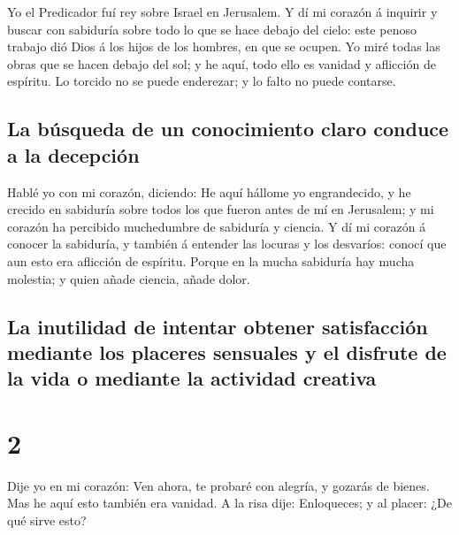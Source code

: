  Yo el Predicador fuí rey sobre Israel en Jerusalem.
 Y dí mi corazón á inquirir y buscar con sabiduría sobre
todo lo que se hace debajo del cielo: este penoso trabajo dió Dios á los
hijos de los hombres, en que se ocupen.  Yo miré todas
las obras que se hacen debajo del sol; y he aquí, todo ello es vanidad y
aflicción de espíritu.  Lo torcido no se puede enderezar;
y lo falto no puede contarse.

\hypertarget{la-buxfasqueda-de-un-conocimiento-claro-conduce-a-la-decepciuxf3n}{%
\subsection{La búsqueda de un conocimiento claro conduce a la
decepción}\label{la-buxfasqueda-de-un-conocimiento-claro-conduce-a-la-decepciuxf3n}}

 Hablé yo con mi corazón, diciendo: He aquí hállome yo
engrandecido, y he crecido en sabiduría sobre todos los que fueron antes
de mí en Jerusalem; y mi corazón ha percibido muchedumbre de sabiduría y
ciencia.  Y dí mi corazón á conocer la sabiduría, y
también á entender las locuras y los desvaríos: conocí que aun esto era
aflicción de espíritu.  Porque en la mucha sabiduría hay
mucha molestia; y quien añade ciencia, añade dolor.

\hypertarget{la-inutilidad-de-intentar-obtener-satisfacciuxf3n-mediante-los-placeres-sensuales-y-el-disfrute-de-la-vida-o-mediante-la-actividad-creativa}{%
\subsection{La inutilidad de intentar obtener satisfacción mediante los
placeres sensuales y el disfrute de la vida o mediante la actividad
creativa}\label{la-inutilidad-de-intentar-obtener-satisfacciuxf3n-mediante-los-placeres-sensuales-y-el-disfrute-de-la-vida-o-mediante-la-actividad-creativa}}

\hypertarget{section-21-2}{%
\section{2}\label{section-21-2}}

 Dije yo en mi corazón: Ven ahora, te probaré con alegría,
y gozarás de bienes. Mas he aquí esto también era vanidad.
 A la risa dije: Enloqueces; y al placer: ¿De qué sirve
esto?

